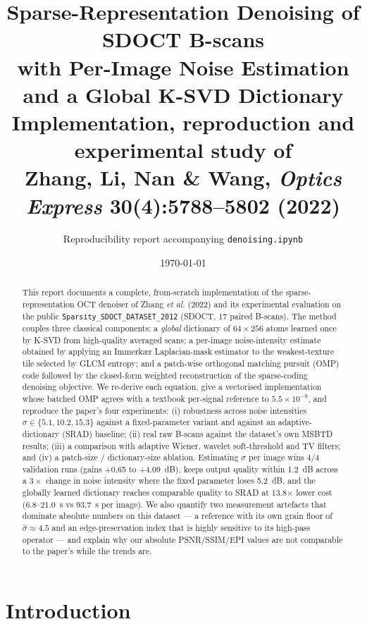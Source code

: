 \documentclass[11pt,a4paper]{article}
\title{\vspace{-1.2cm}\textbf{Sparse-Representation Denoising of SDOCT B-scans\\ with Per-Image Noise Estimation and a Global K-SVD Dictionary}%
\\[0.35em]{\large Implementation, reproduction and experimental study of\\ Zhang, Li, Nan \& Wang, \emph{Optics Express} \textbf{30}(4):5788--5802 (2022)}%
\vspace{-0.2cm}}
\author{Reproducibility report accompanying \texttt{denoising.ipynb}}
\date{\today}
\newcommand{\sh}{\hat{\sigma}}
\begin{document}
\maketitle
\vspace{-0.6cm}

\begin{abstract}
\noindent
This report documents a complete, from-scratch implementation of the sparse-representation OCT denoiser of
Zhang \emph{et al.} (2022) and its experimental evaluation on the public \texttt{Sparsity\_SDOCT\_DATASET\_2012}
(SDOCT, 17 paired B-scans). The method couples three classical components: a \emph{global} dictionary of
$64\times256$ atoms learned once by K-SVD from high-quality averaged scans; a per-image noise-intensity estimate
obtained by applying an Immerkær Laplacian-mask estimator to the weakest-texture tile selected by GLCM entropy; and
a patch-wise orthogonal matching pursuit (OMP) code followed by the closed-form weighted reconstruction of the
sparse-coding denoising objective. We re-derive each equation, give a vectorised implementation whose batched OMP
agrees with a textbook per-signal reference to $5.5\times10^{-9}$, and reproduce the paper's four experiments:
(i) robustness across noise intensities $\sigma\in\{5.1,10.2,15.3\}$ against a fixed-parameter variant and against
an adaptive-dictionary (SRAD) baseline; (ii) real raw B-scans against the dataset's own MSBTD results; (iii) a
comparison with adaptive Wiener, wavelet soft-threshold and TV filters; and (iv) a patch-size / dictionary-size
ablation. Estimating $\sigma$ per image wins 4/4{} validation runs (gains +0.65{} to
+4.09{}~dB), keeps output quality within \SI{1.2}{dB} across a $3\times$ change in noise intensity where
the fixed parameter loses \SI{5.2}{dB}, and the globally learned dictionary reaches comparable quality to SRAD at
13.8$\times$ lower cost (6.8--21.0{}~s vs 93.7{}~s per image). We also quantify two measurement artefacts
that dominate absolute numbers on this dataset --- a reference with its own grain floor of $\sh\approx4.5$ and an
edge-preservation index that is highly sensitive to its high-pass operator --- and explain why our absolute
PSNR/SSIM/EPI values are not comparable to the paper's while the trends are.
\end{abstract}

\tableofcontents
\vspace{0.4cm}

\section{Introduction}
\end{document}
